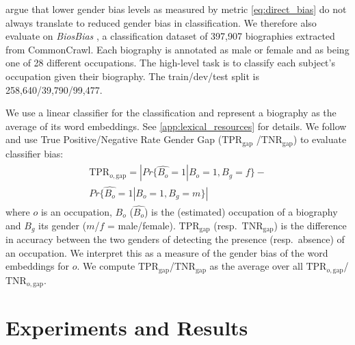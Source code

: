 \documentclass[11pt,a4paper]{article}
\begin{document}
\citet{prost19biasTextClassif} argue that lower gender bias
levels as measured by metric  \eqref{eq:direct_bias}
do not always translate to reduced gender bias in
classification. We therefore also
evaluate on \textit{BiosBias} 
\citep{de19biosbias}, a classification dataset of 397,907 biographies
extracted from
CommonCrawl.
Each biography is annotated as male or female and as being
one
of 
28 different occupations. The high-level task is to
classify each subject's occupation given their
biography.
The train/dev/test split is 
258,640/39,790/99,477.


We use a linear classifier for the classification and
represent a biography as the average of its word
embeddings. See \ref{app:lexical_resources} for details.
We follow \citet{hardt16equality} and use
True Positive/Negative
Rate Gender Gap ($\text{TPR}_{\text{gap}}$
/$\text{TNR}_{\text{gap}}$) to evaluate classifier bias:
\begin{align}
\begin{split}
    \label{eq:TPR}
\text{TPR}_{o,\text{gap}} \!=\!     |Pr\{\hat{B_o}\!=\!1|B_o\!=\!1,B_g\!=\!f\} -\\ Pr\{\hat{B_o}\!=\!1|B_o\!=\!1,B_g\!=\!m\}|
\end{split}
\end{align}
where $o$ is an occupation,
$B_o$ ($\hat{B_o}$) is the (estimated) occupation of a
biography and $B_g$ its gender ($m$/$f$ = male/female).
$\text{TPR}_{\text{gap}}$
(resp.\ $\text{TNR}_{\text{gap}}$)
is the
difference in accuracy between the two genders of
detecting the presence (resp.\ absence) of an occupation.
We interpret this as a measure of the gender bias of the
word embeddings for $o$.
  We compute
  $\text{TPR}_{\text{gap}}$/$\text{TNR}_{\text{gap}}$ as the average over all
  $\text{TPR}_{o,\text{gap}}$/$\text{TNR}_{o,\text{gap}}$.

\section{Experiments and Results} \label{sec:results}
\end{document}
